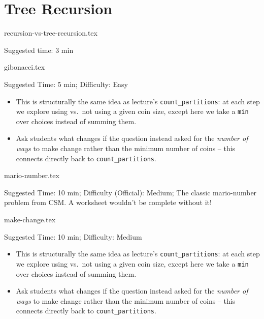 \documentclass{exam}
\begin{document}
\newpage
\section{Tree Recursion}

\begin{questions}
    {recursion-vs-tree-recursion.tex}
    \begin{questionmeta}
        Suggested time: 3 min
    \end{questionmeta}
    {gibonacci.tex}
    \begin{questionmeta}
        Suggested Time: 5 min; Difficulty: Easy
        \begin{itemize}
            \item This is structurally the same idea as lecture's \lstinline{count_partitions}: at each step we explore using vs.\ not using a given coin size, except here we take a \lstinline{min} over choices instead of summing them.
            \item Ask students what changes if the question instead asked for the \emph{number of ways} to make change rather than the minimum number of coins -- this connects directly back to \lstinline{count_partitions}.
        \end{itemize}
    \end{questionmeta}

    {mario-number.tex}
    \begin{questionmeta}
        Suggested Time: 10 min; Difficulty (Official): Medium;
        The classic mario-number problem from CSM. A worksheet wouldn't be complete without it!
    \end{questionmeta}

    {make-change.tex}
    \begin{questionmeta}
        Suggested Time: 10 min; Difficulty: Medium
        \begin{itemize}
            \item This is structurally the same idea as lecture's \lstinline{count_partitions}: at each step we explore using vs.\ not using a given coin size, except here we take a \lstinline{min} over choices instead of summing them.
            \item Ask students what changes if the question instead asked for the \emph{number of ways} to make change rather than the minimum number of coins -- this connects directly back to \lstinline{count_partitions}.
        \end{itemize}
    \end{questionmeta}


\end{questions}
\end{document}

